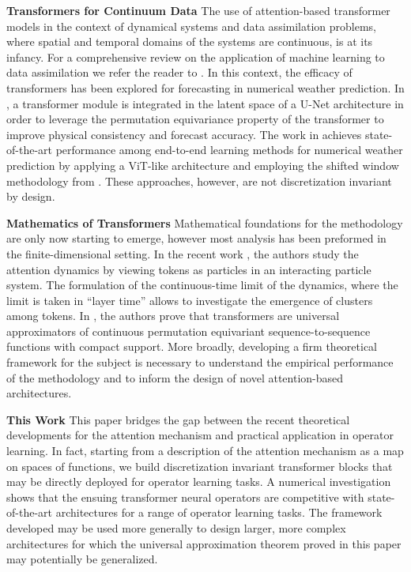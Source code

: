 \documentclass[twoside]{article}
\newcommand{\1}{\mathbbm{1}}
\newcommand{\ec}[1]{{\color{blue}{#1}}}
\begin{document}
\par
 
\textbf{Transformers for Continuum Data} The use of attention-based transformer models in the context of dynamical systems and data assimilation problems, where spatial and temporal domains of the systems are continuous, is at its infancy. For a comprehensive review on the application of machine learning to data assimilation we refer the reader to \citet{cheng2023machine}. In this context, the efficacy of transformers has been explored for forecasting in numerical weather prediction. In \citet{chattopadhyay2022towards}, a transformer module is integrated in the latent space of a U-Net \citep{ronneberger2015unet} architecture in order to leverage the permutation equivariance property of the transformer to improve physical consistency and forecast accuracy. The work in \citet{bi2023accurate} achieves state-of-the-art performance among end-to-end learning methods for numerical weather prediction by applying a ViT-like architecture and employing the shifted window methodology from \citet{liu2021swin}. These approaches, however, are not discretization invariant by design. %
\par

\textbf{Mathematics of Transformers} Mathematical foundations for the methodology are only now starting to emerge, however most analysis has been preformed in the finite-dimensional setting. In the recent work \citet{geshkovski2023emergence}, the authors study the attention dynamics by viewing tokens as particles in an interacting particle system. The formulation of the continuous-time limit of the dynamics, where the limit is taken in ``layer time'' allows to investigate the emergence of clusters among tokens. In \citet{Yun2020Are}, the authors prove that transformers are universal approximators of continuous permutation equivariant sequence-to-sequence functions with compact support. More broadly, developing a firm theoretical framework for the subject is necessary to understand the empirical performance of the methodology and to inform the design of novel attention-based architectures.
\par
\textbf{This Work} This paper bridges the gap between the recent theoretical developments for the attention mechanism and practical application in operator learning. In fact, starting from a description of the attention mechanism as a map on spaces of functions, we build discretization invariant transformer blocks that may be directly deployed for operator learning tasks. A numerical investigation shows that the ensuing transformer neural operators are competitive with state-of-the-art architectures for a range of operator learning tasks. The framework developed may be used more generally to design larger, more complex architectures for which the universal approximation theorem proved in this paper may potentially be generalized.
\end{document}
